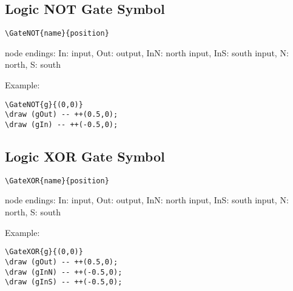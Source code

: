 \documentclass[parskip=full]{scrartcl}
\begin{document}
\subsection{Logic NOT Gate Symbol}

\begin{verbatim}
\GateNOT{name}{position}
\end{verbatim}
node endings: In: input, Out: output,
              InN: north input, InS: south input,
              N: north, S: south

Example:\\
\begin{minipage}{0.8\textwidth}
\begin{verbatim}
\GateNOT{g}{(0,0)}
\draw (gOut) -- ++(0.5,0);
\draw (gIn) -- ++(-0.5,0);
\end{verbatim}
\end{minipage}
\begin{minipage}{0.19\textwidth}
\end{minipage}

\subsection{Logic XOR Gate Symbol}

\begin{verbatim}
\GateXOR{name}{position}
\end{verbatim}
node endings: In: input, Out: output,
              InN: north input, InS: south input,
              N: north, S: south

Example:\\
\begin{minipage}{0.8\textwidth}
\begin{verbatim}
\GateXOR{g}{(0,0)}
\draw (gOut) -- ++(0.5,0);
\draw (gInN) -- ++(-0.5,0);
\draw (gInS) -- ++(-0.5,0);
\end{verbatim}
\end{minipage}
\begin{minipage}{0.19\textwidth}
\end{minipage}
\end{document}
